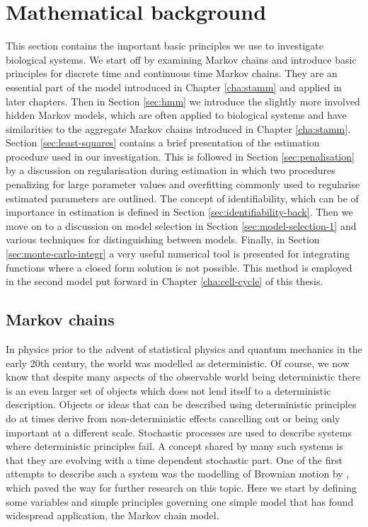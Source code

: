
\section{Mathematical background}
\label{sec:math-backgr}

This section contains the important basic principles we use to investigate biological systems. We start off by examining Markov chains and introduce basic principles for discrete time and continuous time Markov chains. They  are an essential part of the model introduced in Chapter \ref{cha:stamm} and applied in later chapters. Then in Section \ref{sec:hmm} we introduce the slightly more involved hidden Markov models, which are often applied to biological systems and have similarities to the aggregate Markov chains introduced in Chapter \ref{cha:stamm}. Section \ref{sec:least-squares} contains a brief presentation of the estimation procedure used in our investigation. This is followed in Section \ref{sec:penalisation} by a discussion on regularisation during estimation in which two procedures penalizing for large parameter values and overfitting commonly used to regularise estimated parameters are outlined. The concept of identifiability, which can be of importance in estimation is defined in Section \ref{sec:identifiability-back}. Then we move on to a discussion on model selection in Section \ref{sec:model-selection-1} and various techniques for distinguishing between models. Finally, in Section \ref{sec:monte-carlo-integr} a very useful numerical tool is presented for integrating functions where a closed form solution is not possible. This method is employed in the second model put forward in Chapter \ref{cha:cell-cycle} of this thesis.

\subsection{Markov chains}
\label{sec:markov-chains}

In physics prior to the advent of statistical physics and quantum mechanics in the early 20th century, the world was modelled as deterministic. Of course, we now know that despite many aspects of the observable world being deterministic there is an even larger set of objects which does not lend itself to a deterministic description. Objects or ideas that can be described using deterministic principles do at times derive from non-deterministic effects cancelling out or being only important at a different scale. Stochastic processes are used to describe systems where deterministic principles fail. A concept shared by many such systems is that they are evolving with a time dependent stochastic part. One of the first attempts to describe such a system was the modelling of Brownian motion by \cite{Einstein:2005ww}, which paved the way for further research on this topic. Here we start by defining some variables and simple principles governing one simple model that has found widespread application, the Markov chain model.

